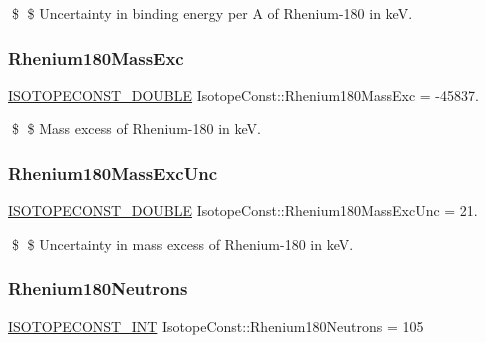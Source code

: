 \$ \$ Uncertainty in binding energy per A of Rhenium-\/180 in keV. \mbox{\label{group___isotope_const-_rhenium-_re180_gaa16a5c13af05d2fca5eeec8e621625ec}} 
\subsubsection{\texorpdfstring{Rhenium180\+Mass\+Exc}{Rhenium180MassExc}}
{\footnotesize\ttfamily \mbox{\hyperlink{group___isotope_const-_macros_ga8f45a7272ce02c0b4c65c44636ed719a}{I\+S\+O\+T\+O\+P\+E\+C\+O\+N\+S\+T\+\_\+\+D\+O\+U\+B\+LE}} Isotope\+Const\+::\+Rhenium180\+Mass\+Exc = -\/45837.}

\$ \$ Mass excess of Rhenium-\/180 in keV. \mbox{\label{group___isotope_const-_rhenium-_re180_ga87c3d5389fe40e25529023dc044e8309}} 
\subsubsection{\texorpdfstring{Rhenium180\+Mass\+Exc\+Unc}{Rhenium180MassExcUnc}}
{\footnotesize\ttfamily \mbox{\hyperlink{group___isotope_const-_macros_ga8f45a7272ce02c0b4c65c44636ed719a}{I\+S\+O\+T\+O\+P\+E\+C\+O\+N\+S\+T\+\_\+\+D\+O\+U\+B\+LE}} Isotope\+Const\+::\+Rhenium180\+Mass\+Exc\+Unc = 21.}

\$ \$ Uncertainty in mass excess of Rhenium-\/180 in keV. \mbox{\label{group___isotope_const-_rhenium-_re180_gad0ebbe09197d306b4cb5c97c57738c71}} 
\subsubsection{\texorpdfstring{Rhenium180\+Neutrons}{Rhenium180Neutrons}}
{\footnotesize\ttfamily \mbox{\hyperlink{group___isotope_const-_macros_ga5f18360b3e99483a35c32d789e62621c}{I\+S\+O\+T\+O\+P\+E\+C\+O\+N\+S\+T\+\_\+\+I\+NT}} Isotope\+Const\+::\+Rhenium180\+Neutrons = 105}

